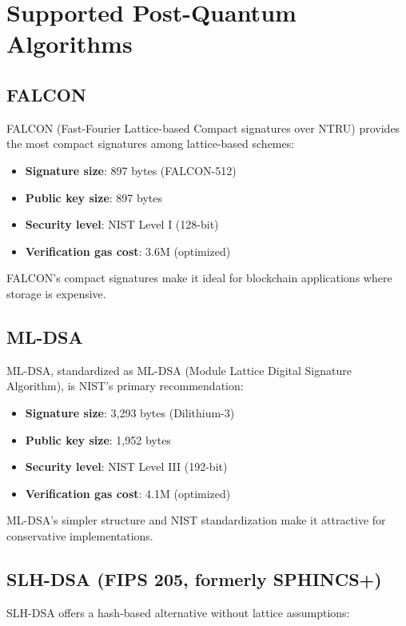 \section{Supported Post-Quantum Algorithms}


\subsection{FALCON}

FALCON (Fast-Fourier Lattice-based Compact signatures over NTRU) provides the most compact signatures among lattice-based schemes:

\begin{itemize}
\item \textbf{Signature size}: 897 bytes (FALCON-512)
\item \textbf{Public key size}: 897 bytes
\item \textbf{Security level}: NIST Level I (128-bit)
\item \textbf{Verification gas cost}: 3.6M (optimized)
\end{itemize}

FALCON's compact signatures make it ideal for blockchain applications where storage is expensive.

\subsection{ML-DSA}

ML-DSA, standardized as ML-DSA (Module Lattice Digital Signature Algorithm), is NIST's primary recommendation:

\begin{itemize}
\item \textbf{Signature size}: 3,293 bytes (Dilithium-3)
\item \textbf{Public key size}: 1,952 bytes
\item \textbf{Security level}: NIST Level III (192-bit)
\item \textbf{Verification gas cost}: 4.1M (optimized)
\end{itemize}

ML-DSA's simpler structure and NIST standardization make it attractive for conservative implementations.

\subsection{SLH-DSA (FIPS 205, formerly SPHINCS+)}

SLH-DSA offers a hash-based alternative without lattice assumptions:

